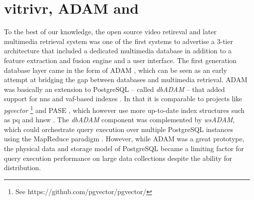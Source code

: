 \section{vitrivr, ADAM and \adampro{}}

To the best of our knowledge, the open source \vitrivr{} video retireval \cite{Rossetto:2016vitrivr} and later multimedia retrieval \cite{Gasser:2019Multimodal} system was one of the first systems to advertise a 3-tier architecture that included a dedicated multimedia database in addition to a feature extraction and fusion engine and a user interface. The first generation database layer came in the form of ADAM \cite{Giangreco:2014Adam}, which can be seen as an early attempt at bridging the gap between databases and multimedia retrieval. ADAM was basically an extension to PostgreSQL -- called \emph{dbADAM} -- that added support for \acrshort{nns} and \acrshort{vaf}-based indexes \cite{Weber:1998Va}. In that it is comparable to projects like \emph{pgvector} \footnote{See https://github.com/pgvector/pgvector/} and PASE \cite{Yang:2020Pase}, which however use more up-to-date index structures such as \acrshort{pq} \cite{Jegou:2010Product} and \acrshort{hnsw} \cite{Malkov:2018Efficient}. The \emph{dbADAM} component was complemented by \emph{wsADAM}, which could orchestrate query execution over multiple PostgreSQL instances using the MapReduce paradigm \cite{Dean:2008Mapreduce}. However, while ADAM was a great prototype, the physical data and storage model of PostgreSQL became a limiting factor for query execution performance on large data collections despite the ability for distribution.

